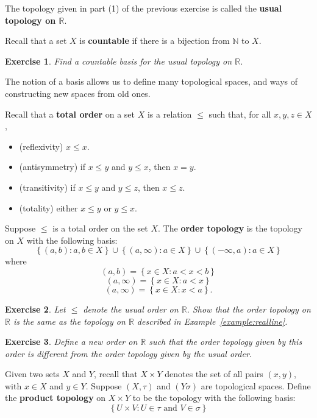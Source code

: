 \documentclass[12pt]{amsart}
\newtheorem{exercise}{Exercise}[section]
\theoremstyle{definition}
\theoremstyle{remark}
\newcommand{\R}{\mathbb{R}}
\newcommand{\N}{\mathbb{N}}
\newcommand{\explicitSet}[1]{\left\lbrace #1 \right\rbrace}
\newcommand{\set}[2]{\explicitSet{#1 \colon #2}}
\newcommand{\0}{\emptyset}
\begin{document}
The topology given in part (1) of the previous exercise is called the \textbf{usual topology on $\R$}.

Recall that a set $X$ is \textbf{countable} if there is a bijection from $\N$ to $X$.

\begin{exercise}
Find a countable basis for the usual topology on $\R$.
\end{exercise}


The notion of a basis allows us to define many topological spaces, and ways of constructing new spaces from old ones.

Recall that a \textbf{total order} on a set $X$ is a relation $\leq$ such that, for all $x,y,z \in X$,
\begin{itemize}
\item (reflexivity) $x \leq x$.
\item (antisymmetry) if $x \leq y$ and $y \leq x$, then $x=y$.
\item (transitivity) if $x \leq y$ and $y \leq z$, then $x \leq z$.
\item (totality) either $x \leq y$ or $y \leq x$.
\end{itemize}

Suppose $\leq$ is a total order on the set $X$. The \textbf{order topology} is the topology on $X$ with the following basis:
$$\set{(a,b)}{a,b \in X} \cup \set{(a,\infty)}{a \in X} \cup \set{(-\infty,a)}{a \in X}$$
where
$$(a,b) = \set{x \in X}{a < x < b}$$
$$(a,\infty) = \set{x \in X}{a < x}$$
$$(a,\infty) = \set{x \in X}{x < a}.$$

\begin{exercise}
Let $\leq$ denote the usual order on $\R$. Show that the order topology on $\R$ is the same as the topology on $\R$ described in Example~\ref{example:realline}.
\end{exercise}

\begin{exercise}
Define a new order on $\R$ such that the order topology given by this order is different from the order topology given by the usual order.
\end{exercise}

Given two sets $X$ and $Y$, recall that $X \times Y$ denotes the set of all pairs $(x,y)$, with $x \in X$ and $y \in Y$. Suppose $(X,\tau)$ and $(Y\sigma)$ are topological spaces. Define the \textbf{product topology} on $X \times Y$ to be the topology with the following basis:
$$\set{U \times V}{U \in \tau \text{ and } V \in \sigma}$$ 
\end{document}
